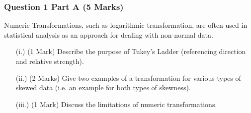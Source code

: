 \documentclass[a4paper,12pt]{article}
\begin{document}
\subsubsection*{Question 1 Part A (5 Marks)}
Numeric Transformations, such as logarithmic transformation, are often used in statistical analysis as an approach for dealing with non-normal data.
\begin{itemize}
	\item[(i.)] (1 Mark) Describe the purpose of Tukey's Ladder (referencing direction and relative strength).
	\item[(ii.)] (2 Marks) Give two examples of a transformation for various types of skewed data (i.e. an example for both types of skewness).
	\item[(iii.)] (1 Mark) Discuss the limitations of numeric transformations.
\end{itemize}
\bigskip
\end{document}
